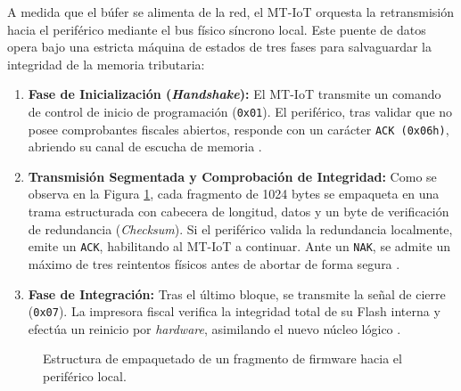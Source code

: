 \par A medida que el búfer se alimenta de la red, el MT-IoT orquesta la retransmisión hacia el periférico mediante el bus físico síncrono local. Este puente de datos opera bajo una estricta máquina de estados de tres fases para salvaguardar la integridad de la memoria tributaria:

\begin{enumerate}
    \item \textbf{Fase de Inicialización (\textit{Handshake}):} El MT-IoT transmite un comando de control de inicio de programación (\texttt{0x01}). El periférico, tras validar que no posee comprobantes fiscales abiertos, responde con un carácter \texttt{ACK (0x06h)}, abriendo su canal de escucha de memoria \cite{TheFactoryHKA_Manual_Protocolos}.
    
    \item \textbf{Transmisión Segmentada y Comprobación de Integridad:} Como se observa en la Figura \ref{fig:empaquetado_ota}, cada fragmento de 1024 bytes se empaqueta en una trama estructurada con cabecera de longitud, datos y un byte de verificación de redundancia (\textit{Checksum}). Si el periférico valida la redundancia localmente, emite un \texttt{ACK}, habilitando al MT-IoT a continuar. Ante un \texttt{NAK}, se admite un máximo de tres reintentos físicos antes de abortar de forma segura \cite{TheFactoryHKA_Manual_Protocolos}.
    
    \item \textbf{Fase de Integración:} Tras el último bloque, se transmite la señal de cierre (\texttt{0x07}). La impresora fiscal verifica la integridad total de su Flash interna y efectúa un reinicio por \textit{hardware}, asimilando el nuevo núcleo lógico \cite{TheFactoryHKA_Manual_Protocolos}.
\end{enumerate}

\begin{figure}[htbp]
\centering
{}
\caption{Estructura de empaquetado de un fragmento de firmware hacia el periférico local.}
\label{fig:empaquetado_ota}
\end{figure}

